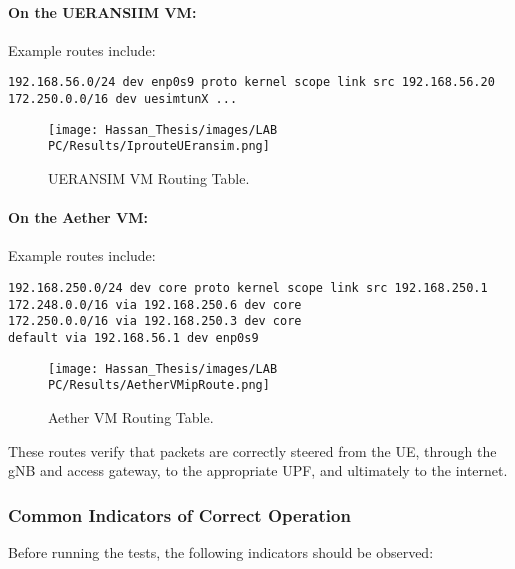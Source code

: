 \paragraph{On the UERANSIIM VM:}
Example routes include:
\begin{lstlisting}[breaklines=true, basicstyle=\small\ttfamily]
192.168.56.0/24 dev enp0s9 proto kernel scope link src 192.168.56.20
172.250.0.0/16 dev uesimtunX ...
\end{lstlisting}

\begin{figure}[H]
    \centering
    \texttt{[image: Hassan\_Thesis/images/LAB PC/Results/IprouteUEransim.png]}
    \caption{UERANSIM VM Routing Table.}
    \label{fig:ueransim-routing-table}        
\end{figure}

\paragraph{On the Aether VM:}
Example routes include:
\begin{verbatim}
192.168.250.0/24 dev core proto kernel scope link src 192.168.250.1
172.248.0.0/16 via 192.168.250.6 dev core
172.250.0.0/16 via 192.168.250.3 dev core
default via 192.168.56.1 dev enp0s9
\end{verbatim}

\begin{figure}[H]
    \centering
    \texttt{[image: Hassan\_Thesis/images/LAB PC/Results/AetherVMipRoute.png]}
    \caption{Aether VM Routing Table.}
    \label{fig:aethervm-routing-table}
\end{figure}

These routes verify that packets are correctly steered from the UE, through the 
gNB and access gateway, to the appropriate UPF, and ultimately to the internet.


\subsubsection{Common Indicators of Correct Operation}
\label{subsec:correct-operation}

Before running the tests, the following indicators should be observed:

